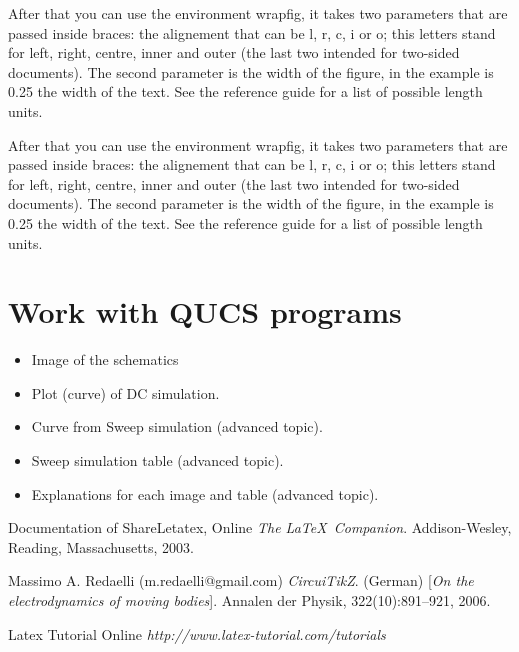 \documentclass{report}
\begin{document}
  After that you can use the environment wrapfig, it takes two parameters that are passed inside braces: the alignement that can be l, r, c, i or o; this letters stand for left, right, centre, inner and outer (the last two intended for two-sided documents). The second parameter is the width of the figure, in the example is 0.25 the width of the text. See the reference guide for a list of possible length units.\cite{firstRef,thirdRef}
  
   After that you can use the environment wrapfig, it takes two parameters that are passed inside braces: the alignement that can be l, r, c, i or o; this letters stand for left, right, centre, inner and outer (the last two intended for two-sided documents). The second parameter is the width of the figure, in the example is 0.25 the width of the text. See the reference guide for a list of possible length units.\cite{firstRef,thirdRef}
 
 
 \section{Work with QUCS programs}


\begin{itemize}
\item Image of the schematics
\item Plot (curve) of DC simulation.
\item Curve from Sweep simulation (advanced topic).
\item Sweep simulation table (advanced topic).
\item Explanations for each image and table (advanced topic).
\end{itemize}




\begin{thebibliography}{9}
Documentation of ShareLetatex, Online
\textit{The \LaTeX\ Companion}. 
Addison-Wesley, Reading, Massachusetts, 2003.
 
Massimo A. Redaelli (m.redaelli@gmail.com)
\textit{CircuiTikZ}. (German) 
[\textit{On the electrodynamics of moving bodies}]. 
Annalen der Physik, 322(10):891–921, 2006.
 
Latex Tutorial Online
\textit{http://www.latex-tutorial.com/tutorials}
\end{thebibliography}
\end{document}
